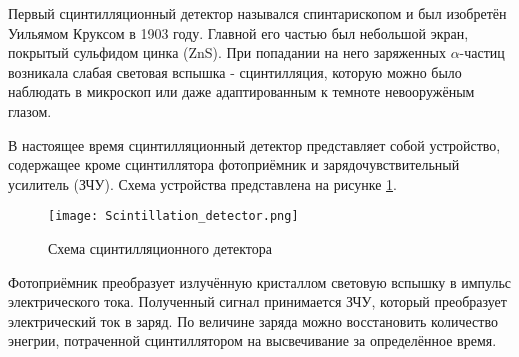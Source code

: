 Первый сцинтилляционный детектор назывался спинтарископом и был изобретён Уильямом Круксом в 1903 году. Главной его частью был небольшой экран, покрытый сульфидом цинка (ZnS). При попадании на него заряженных $\alpha$-частиц возникала слабая световая вспышка - сцинтилляция, которую можно было наблюдать в микроскоп или даже адаптированным к темноте невооружёным глазом.\par
В настоящее время сцинтилляционный детектор представляет собой устройство, содержащее кроме сцинтиллятора фотоприёмник и зарядочувствительный усилитель (ЗЧУ). Схема устройства представлена на рисунке \ref{fig:Scint_det}.\par
\begin{figure}[ht]
    \centering
    \texttt{[image: Scintillation\_detector.png]}
    \caption{Схема сцинтилляционного детектора}
    \label{fig:Scint_det}
\end{figure}
Фотоприёмник преобразует излучённую кристаллом световую вспышку в импульс электрического тока. Полученный сигнал принимается ЗЧУ, который преобразует электрический ток в заряд. По величине заряда можно восстановить количество энегрии, потраченной сцинтиллятором на высвечивание за определённое время.
